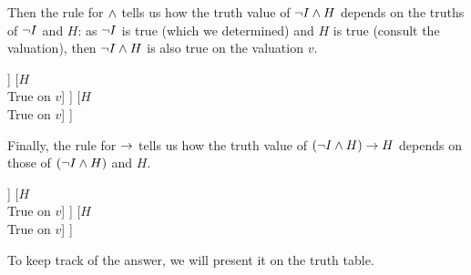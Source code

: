 Then the rule for $\mathbin{\wedge}$ tells us how the truth value of $\neg I\mathbin{\wedge} H$ depends on the truths of $\neg I$ and $H$: as $\neg I$ is true (which we determined) and $H$ is true (consult the valuation), then $\neg I \mathbin{\wedge} H$ is also true on the valuation $v$.
\begin{center}
	\begin{forest}
		[$(\enot I\eand H)\mainconnective{\eif} H$\\
		[$(\enot I\mainconnective{\eand} H)$\\True on $v$
		[$\mainconnective{\enot} I$\\True on $v$
		[$I$\\False on $v$]
		]
		[$H$\\True on $v$]
		]
		[$H$\\True on $v$]
		]
	\end{forest}
\end{center}
Finally, the rule for $\rightarrow$ tells us how the truth value of $(\neg I\mathbin{\wedge} H)\rightarrow H$ depends on those of $(\neg I\mathbin{\wedge} H)$ and $H$.
\begin{center}
	\begin{forest}
		[$(\enot I\eand H)\mainconnective{\eif} H$\\True on $v$
		[$(\enot I\mainconnective{\eand} H)$\\True on $v$
		[$\mainconnective{\enot} I$\\True on $v$
		[$I$\\False on $v$]
		]
		[$H$\\True on $v$]
		]
		[$H$\\True on $v$]
		]
	\end{forest}
\end{center}


To keep track of the answer, we will present it on the truth table. 

